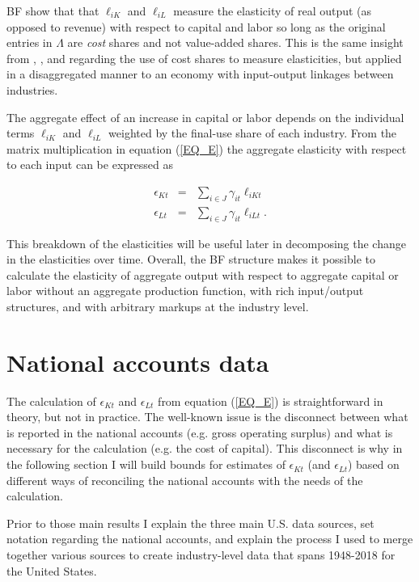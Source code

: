 \documentclass[11pt]{article}
\begin{document}
BF show that that $\ell_{iK}$ and $\ell_{iL}$ measure the elasticity of real output (as opposed to revenue) with respect to capital and labor so long as the original entries in $\Lambda$ are \textit{cost} shares and not value-added shares. This is the same insight from \cite{hall1988,hall1990}, \cite{basufernald}, and \cite{fernaldneiman2011} regarding the use of cost shares to measure elasticities, but applied in a disaggregated manner to an economy with input-output linkages between industries.

The aggregate effect of an increase in capital or labor depends on the individual terms $\ell_{iK}$ and $\ell_{iL}$ weighted by the final-use share of each industry. From the matrix multiplication in equation (\ref{EQ_E}) the aggregate elasticity with respect to each input can be expressed as

\begin{eqnarray}
	\epsilon_{Kt} &=& \sum_{i \in J} \gamma_{it} \ell_{iKt} \\ \nonumber
	\epsilon_{Lt} &=& \sum_{i \in J} \gamma_{it} \ell_{iLt}. \label{EQ_epsilonK}
\end{eqnarray}

This breakdown of the elasticities will be useful later in decomposing the change in the elasticities over time. Overall, the BF structure makes it possible to calculate the elasticity of aggregate output with respect to aggregate capital or labor without an  aggregate production function, with rich input/output structures, and with arbitrary markups at the industry level.

\section{National accounts data}\label{SEC_accounts}
The calculation of $\epsilon_{Kt}$ and $\epsilon_{Lt}$ from equation (\ref{EQ_E}) is straightforward in theory, but not in practice. The well-known issue is the disconnect between what is reported in the national accounts (e.g. gross operating surplus) and what is necessary for the calculation (e.g. the cost of capital). This disconnect is why in the following section I will build bounds for estimates of $\epsilon_{Kt}$ (and $\epsilon_{Lt}$) based on different ways of reconciling the national accounts with the needs of the calculation. 

Prior to those main results I explain the three main U.S. data sources, set notation regarding the national accounts, and explain the process I used to merge together various sources to create industry-level data that spans 1948-2018 for the United States.
\end{document}
